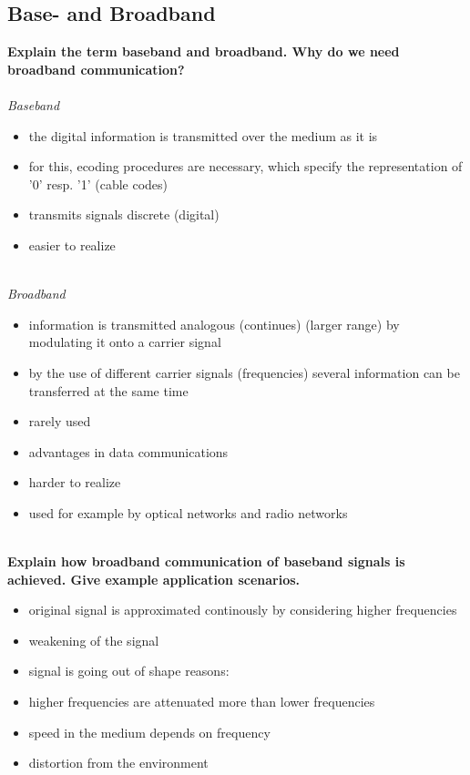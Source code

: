 \documentclass[a4paper,12pt]{article}
\begin{document}
\subsection{Base- and Broadband}
\textbf{Explain the term baseband and broadband. Why do we need broadband communication?}\\
\\
\textit{Baseband}
\begin{itemize}[itemsep=0pt]
	\item  the digital information is transmitted over the medium as it is
	\item  for this, ecoding procedures are necessary, which specify the representation of '0' resp. '1' (cable codes)
	\item  transmits signals discrete (digital)
	\item  easier to realize
\end{itemize}
~\\
\textit{Broadband}
\begin{itemize}[itemsep=0pt]
	\item  information is transmitted analogous (continues) (larger range) by modulating it onto a carrier signal
	\item  by the use of different carrier signals (frequencies) several information can be transferred at the same time
	\item  rarely used
	\item  advantages in data communications
	\item  harder to realize
	\item  used for example by optical networks and radio networks
\end{itemize}
~\\
\textbf{Explain how broadband communication of baseband signals is achieved. Give example application scenarios.}\\

\begin{itemize}[itemsep=0pt]
	\item  original signal is approximated continously by considering higher frequencies
	\item  weakening of the signal
	\item  signal is going out of shape
	reasons:
	\item  higher frequencies are attenuated more than lower frequencies
	\item  speed in the medium depends on frequency
	\item  distortion from the environment
\end{itemize}
\end{document}
